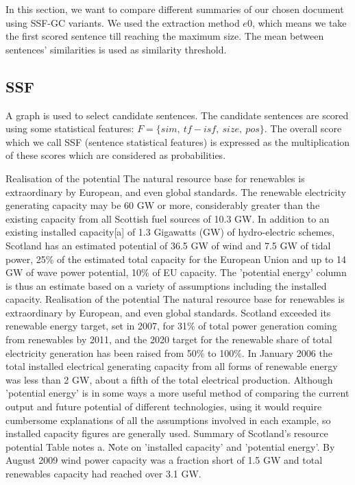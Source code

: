 In this section, we want to compare different summaries of our chosen document using SSF-GC variants.
We used the extraction method $e0$, which means we take the first scored sentence till reaching the maximum size. 
The mean between sentences' similarities is used as similarity threshold.

\subsection{SSF}

A graph is used to select candidate sentences.
The candidate sentences are scored using some statistical features: $ F = \{ sim,\ tf-isf,\ size,\ pos \} $.
The overall score which we call SSF (sentence statistical features) is expressed as the multiplication of these scores which are considered as probabilities.

\begin{tcolorbox}\footnotesize
	Realisation of the potential The natural resource base for renewables is extraordinary by European, and even global standards.
	The renewable electricity generating capacity may be 60 GW or more, considerably greater than the existing capacity from all Scottish fuel sources of 10.3 GW.
	In addition to an existing installed capacity[a] of 1.3 Gigawatts (GW) of hydro-electric schemes, Scotland has an estimated potential of 36.5 GW of wind and 7.5 GW of tidal power, 25\% of the estimated total capacity for the European Union and up to 14 GW of wave power potential, 10\% of EU capacity.
	The 'potential energy' column is thus an estimate based on a variety of assumptions including the installed capacity.
	Realisation of the potential The natural resource base for renewables is extraordinary by European, and even global standards.
	Scotland exceeded its renewable energy target, set in 2007, for 31\% of total power generation coming from renewables by 2011, and the 2020 target for the renewable share of total electricity generation has been raised from 50\% to 100\%.
	In January 2006 the total installed electrical generating capacity from all forms of renewable energy was less than 2 GW, about a fifth of the total electrical production.
	Although 'potential energy' is in some ways a more useful method of comparing the current output and future potential of different technologies, using it would require cumbersome explanations of all the assumptions involved in each example, so installed capacity figures are generally used.
	Summary of Scotland's resource potential Table notes a. \^ Note on 'installed capacity' and 'potential energy'.
	By August 2009 wind power capacity was a fraction short of 1.5 GW and total renewables capacity had reached over 3.1 GW.
\end{tcolorbox}

